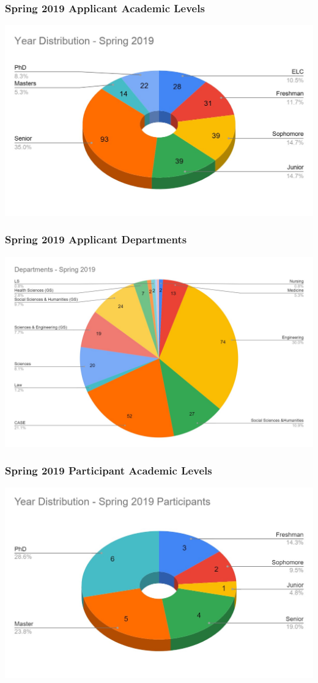       \begin{frame}
        \frametitle{Spring 2019 Applicant Academic Levels}
        \centering
        \includegraphics[height=0.75\textheight]{images/year_distribution_spr2019.jpg}
      \end{frame}

      \begin{frame}
        \frametitle{Spring 2019 Applicant Departments}
        \centering
        \includegraphics[height=0.75\textheight]{images/departments_spr2019.jpg}
      \end{frame}

      \begin{frame}
        \frametitle{Spring 2019 Participant Academic Levels}
        \centering
        \includegraphics[height=0.75\textheight]{images/year_distribution_selected_spr2019.jpg}
      \end{frame}

